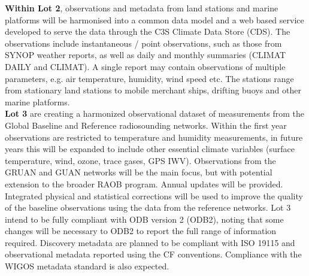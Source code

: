 \documentclass[a4paper]{article}
\begin{document}
\textbf{Within Lot 2}, observations and metadata from land stations and marine platforms will be harmonised into a common data model and a web based service developed to serve the data through the C3S Climate Data Store (CDS). The observations include instantaneous / point observations, such as those from SYNOP weather reports, as well as daily and monthly summaries (CLIMAT DAILY and CLIMAT). A single report may contain observations of multiple parameters, e.g. air temperature, humidity, wind speed etc. The stations range from stationary land stations to mobile merchant ships, drifting buoys and other marine platforms.\\

\textbf{Lot 3} are creating a harmonized observational dataset of measurements from the Global Baseline and Reference radiosounding networks. Within the first year observations are restricted to temperature and humidity measurements, in future years this will be expanded to include other essential climate variables (surface temperature, wind, ozone, trace gases, GPS IWV). Observations from the GRUAN and GUAN networks will be the main focus, but with potential extension to the broader RAOB program. Annual updates will be provided. Integrated physical and statistical corrections will be used to improve the quality of the baseline observations using the data from the reference networks. Lot 3 intend to be fully compliant with ODB version 2 (ODB2), noting that some changes will be necessary to ODB2 to report the full range of information required. Discovery metadata are planned to be compliant with ISO 19115 and observational metadata reported using the CF conventions. Compliance with the WIGOS metadata standard is also expected. \\
\end{document}
